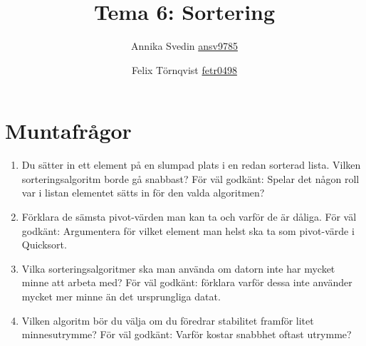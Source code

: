 \documentclass[a5paper,10pt,oneside]{article}
\title{Tema 6: Sortering}
\author{Annika Svedin \url{ansv9785} \and Felix Törnqvist \url{fetr0498}}
\begin{document}
\maketitle

\section*{Muntafrågor}

\begin{enumerate}

	\item Du sätter in ett element på en slumpad plats i en redan sorterad lista. Vilken sorteringsalgoritm borde gå snabbast?
		För väl godkänt: Spelar det någon roll var i listan elementet sätts in för den valda algoritmen?
	
	
	\item Förklara de sämsta pivot-värden man kan ta och varför de är dåliga. För väl godkänt:  Argumentera för vilket element man helst ska ta som pivot-värde i Quicksort.
	
	\item Vilka sorteringsalgoritmer ska man använda om datorn inte har mycket minne att arbeta med? För väl godkänt: förklara varför dessa inte använder mycket mer minne än det ursprungliga datat.
	
	\item Vilken algoritm bör du välja om du föredrar stabilitet framför litet minnesutrymme? För väl godkänt: Varför kostar snabbhet oftast utrymme?
	
\end{enumerate}
\end{document}
